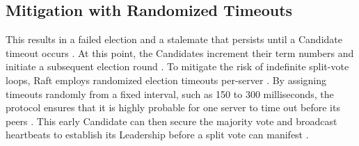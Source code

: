 \documentclass[a4paper,11pt]{article}
\begin{document}
\subsection{Mitigation with Randomized Timeouts}
This results in a failed election and a stalemate that persists until a Candidate
timeout occurs \cite{tanenbaum2007distributed}.
At this point, the Candidates increment their term numbers and
initiate a subsequent election round \cite{tanenbaum2007distributed}.
To mitigate the risk of indefinite split-vote loops, Raft employs randomized
election timeouts per-server \cite{tanenbaum2007distributed}.
By assigning timeouts randomly from a fixed interval, such as 150 to 300 milliseconds,
the protocol ensures that it is highly probable for one server to time out before
its peers \cite{tanenbaum2007distributed}.
This early Candidate can then secure the majority vote and broadcast
heartbeats to establish its Leadership before a split vote can manifest \cite{tanenbaum2007distributed}.


 
 
\end{document}
